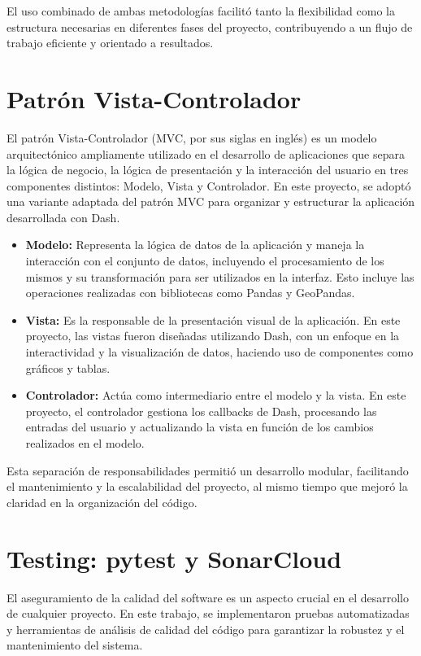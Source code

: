 El uso combinado de ambas metodologías facilitó tanto la flexibilidad como la estructura necesarias en diferentes fases del proyecto, contribuyendo a un flujo de trabajo eficiente y orientado a resultados.


\section{Patrón Vista-Controlador}

El patrón Vista-Controlador (MVC, por sus siglas en inglés) es un modelo arquitectónico ampliamente utilizado en el desarrollo de aplicaciones que separa la lógica de negocio, la lógica de presentación y la interacción del usuario en tres componentes distintos: Modelo, Vista y Controlador. En este proyecto, se adoptó una variante adaptada del patrón MVC para organizar y estructurar la aplicación desarrollada con Dash. 

\begin{itemize}
    \item \textbf{Modelo:} Representa la lógica de datos de la aplicación y maneja la interacción con el conjunto de datos, incluyendo el procesamiento de los mismos y su transformación para ser utilizados en la interfaz. Esto incluye las operaciones realizadas con bibliotecas como Pandas y GeoPandas.
    \item \textbf{Vista:} Es la responsable de la presentación visual de la aplicación. En este proyecto, las vistas fueron diseñadas utilizando Dash, con un enfoque en la interactividad y la visualización de datos, haciendo uso de componentes como gráficos y tablas.
    \item \textbf{Controlador:} Actúa como intermediario entre el modelo y la vista. En este proyecto, el controlador gestiona los callbacks de Dash, procesando las entradas del usuario y actualizando la vista en función de los cambios realizados en el modelo.
\end{itemize}

Esta separación de responsabilidades permitió un desarrollo modular, facilitando el mantenimiento y la escalabilidad del proyecto, al mismo tiempo que mejoró la claridad en la organización del código.


\section{Testing: pytest y SonarCloud}

El aseguramiento de la calidad del software es un aspecto crucial en el desarrollo de cualquier proyecto. En este trabajo, se implementaron pruebas automatizadas y herramientas de análisis de calidad del código para garantizar la robustez y el mantenimiento del sistema.

